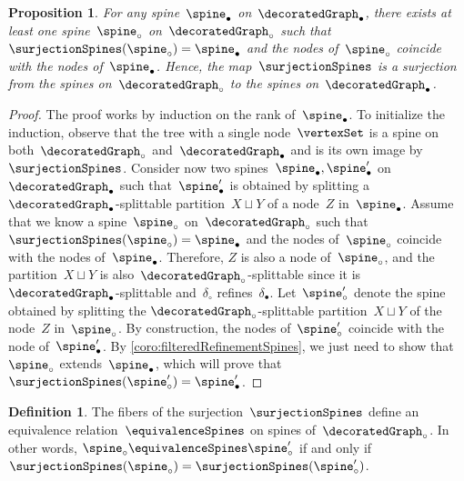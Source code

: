 \documentclass{amsart}
\newtheorem{proposition}[theorem]{Proposition}
\theoremstyle{definition}
\newtheorem{definition}[theorem]{Definition}
\newcommand{\vincent}[1]{\todo[color=blue!30]{#1 \\ \hfill --- V.}}
\newcommand{\decoration}{\delta}
\begin{document}
\begin{proposition}
  \label{prop:refinementSpines}
  For any spine~$\spine_\bullet$ on~$\decoratedGraph_\bullet$, there exists at least one spine~$\spine_\circ$ on~$\decoratedGraph_\circ$ such that ${\surjectionSpines(\spine_\circ) = \spine_\bullet}$ and the nodes of~$\spine_\circ$ coincide with the nodes of~$\spine_\bullet$.
  Hence, the map~$\surjectionSpines$ is a surjection from the spines on~$\decoratedGraph_\circ$ to the spines on~$\decoratedGraph_\bullet$.
\end{proposition}

\begin{proof}
  The proof works by induction on the rank of~$\spine_\bullet$.
  To initialize the induction, observe that the tree with a single node~$\vertexSet$ is a spine on both~$\decoratedGraph_\circ$ and~$\decoratedGraph_\bullet$ and is its own image by~$\surjectionSpines$.
  Consider now two spines~$\spine_\bullet, \spine_\bullet'$ on~$\decoratedGraph_\bullet$ such that~$\spine_\bullet'$ is obtained by splitting a $\decoratedGraph_\bullet$-splittable partition~$X \sqcup Y$ of a node~$Z$ in~$\spine_\bullet$.
  Assume that we know a spine~$\spine_\circ$ on~$\decoratedGraph_\circ$ such that~${\surjectionSpines(\spine_\circ) = \spine_\bullet}$ and the nodes of~$\spine_\circ$ coincide with the nodes of~$\spine_\bullet$.
  Therefore, $Z$ is also a node of~$\spine_\circ$, and the partition~$X \sqcup Y$ is also~$\decoratedGraph_\circ$-splittable since it is $\decoratedGraph_\bullet$-splittable and~$\decoration_\circ$ refines~$\decoration_\bullet$.
  Let~$\spine_\circ'$ denote the spine obtained by splitting the  $\decoratedGraph_\circ$-splittable partition~$X \sqcup Y$ of the node~$Z$ in~$\spine_\circ$.
  By construction, the nodes of~$\spine_\circ'$ coincide with the node of~$\spine_\bullet'$.
  By \cref{coro:filteredRefinementSpines}, we just need to show that~$\spine_\circ$ extends~$\spine_\bullet$, which will prove that~${\surjectionSpines(\spine_\circ') = \spine_\bullet'}$.
  \vincent{todo}
\end{proof}

\begin{definition}
  \label{def:equivalenceRelation}
  The fibers of the surjection~$\surjectionSpines$ define an equivalence relation~$\equivalenceSpines$ on spines of~$\decoratedGraph_\circ$. In other words, $\spine_\circ \equivalenceSpines \spine_\circ'$ if and only if~$\surjectionSpines(\spine_\circ) = \surjectionSpines(\spine_\circ')$.
\end{definition}
\end{document}
